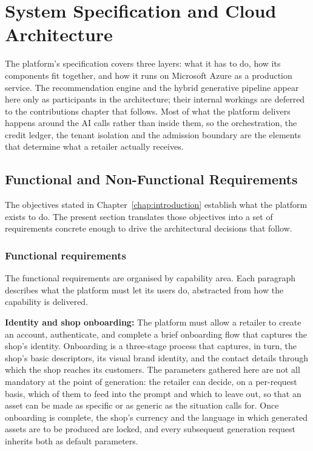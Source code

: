 \chapter{System Specification and Cloud Architecture}
\label{chap:architecture}

The platform's specification covers three layers: what it has to do, how its components fit together, and how it runs on Microsoft Azure as a production service. The recommendation engine and the hybrid generative pipeline appear here only as participants in the architecture; their internal workings are deferred to the contributions chapter that follows. Most of what the platform delivers happens around the AI calls rather than inside them, so the orchestration, the credit ledger, the tenant isolation and the admission boundary are the elements that determine what a retailer actually receives.

\section{Functional and Non-Functional Requirements}
\label{sec:requirements}

The objectives stated in Chapter~\ref{chap:introduction} establish what the platform exists to do. The present section translates those objectives into a set of requirements concrete enough to drive the architectural decisions that follow.

\subsection{Functional requirements}
\label{subsec:functional-requirements}

The functional requirements are organised by capability area. Each paragraph describes what the platform must let its users do, abstracted from how the capability is delivered.

\textbf{Identity and shop onboarding:} The platform must allow a retailer to create an account, authenticate, and complete a brief onboarding flow that captures the shop's identity. Onboarding is a three-stage process that captures, in turn, the shop's basic descriptors, its visual brand identity, and the contact details through which the shop reaches its customers. The parameters gathered here are not all mandatory at the point of generation: the retailer can decide, on a per-request basis, which of them to feed into the prompt and which to leave out, so that an asset can be made as specific or as generic as the situation calls for. Once onboarding is complete, the shop's currency and the language in which generated assets are to be produced are locked, and every subsequent generation request inherits both as default parameters.

